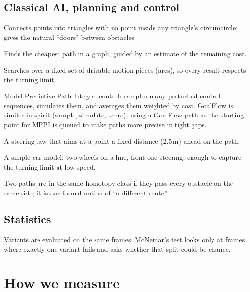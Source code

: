 \documentclass[11pt,a4paper]{article}
\begin{document}
\subsection{Classical AI, planning and control}
\begin{description}[style=nextline,leftmargin=0pt]
  \item[Delaunay triangulation] Connects points into triangles with no point inside any triangle's
        circumcircle; gives the natural ``doors'' between obstacles.
  \item[A* search] Finds the cheapest path in a graph, guided by an estimate of the remaining cost.
  \item[Lattice planning] Searches over a fixed set of drivable motion pieces (arcs), so every result
        respects the turning limit.
  \item[MPPI] Model Predictive Path Integral control: samples many perturbed control sequences, simulates
        them, and averages them weighted by cost. GoalFlow is similar in spirit (sample, simulate, score);
        using a GoalFlow path as the starting point for MPPI is queued to make paths more precise in tight gaps.
  \item[Pure pursuit] A steering law that aims at a point a fixed distance (2.5\,m) ahead on the path.
  \item[Kinematic bicycle model] A simple car model: two wheels on a line, front one steering; enough to
        capture the turning limit at low speed.
  \item[Homotopy] Two paths are in the same homotopy class if they pass every obstacle on the same side;
        it is our formal notion of ``a different route''.
\end{description}

\subsection{Statistics}
\begin{description}[style=nextline,leftmargin=0pt]
  \item[Paired comparison and McNemar's test] Variants are evaluated on the same frames. McNemar's test
        looks only at frames where exactly one variant fails and asks whether that split could be chance.
\end{description}

\section{How we measure}
\end{document}
